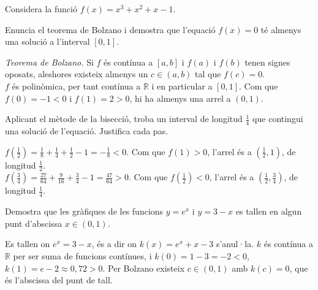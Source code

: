 Considera la funció $f(x)=x^3+x^2+x-1$.

\begin{apartats}

Enuncia el teorema de Bolzano i demostra que l'equació $f(x)=0$ té almenys una solució
a l'interval $[0,1]$.

\begin{solucio}
\emph{Teorema de Bolzano.} Si $f$ és contínua a $[a,b]$ i $f(a)$ i $f(b)$ tenen signes
oposats, aleshores existeix almenys un $c\in(a,b)$ tal que $f(c)=0$.\\
$f$ és polinòmica, per tant contínua a $\mathbb{R}$ i en particular a $[0,1]$.
Com que $f(0)=-1<0$ i $f(1)=2>0$, hi ha almenys una arrel a $(0,1)$.
\end{solucio}

Aplicant el mètode de la bisecció, troba un interval de longitud $\tfrac14$ que contingui
una solució de l'equació. Justifica cada pas.

\begin{solucio}
$f\!\left(\tfrac12\right)=\tfrac18+\tfrac14+\tfrac12-1=-\tfrac18<0$. Com que
$f(1)>0$, l'arrel és a $\left(\tfrac12,1\right)$, de longitud $\tfrac12$.\\
$f\!\left(\tfrac34\right)=\tfrac{27}{64}+\tfrac{9}{16}+\tfrac34-1=\tfrac{47}{64}>0$.
Com que $f\!\left(\tfrac12\right)<0$, l'arrel és a
$\left(\tfrac12,\tfrac34\right)$, de longitud $\tfrac14$.
\end{solucio}

Demostra que les gràfiques de les funcions $y=e^{x}$ i $y=3-x$ es tallen en algun punt
d'abscissa $x\in(0,1)$.

\begin{solucio}
Es tallen on $e^x=3-x$, és a dir on $k(x)=e^x+x-3$ s'anul·la. $k$ és contínua a
$\mathbb{R}$ per ser suma de funcions contínues, i
$k(0)=1-3=-2<0$, $k(1)=e-2\approx0{,}72>0$.
Per Bolzano existeix $c\in(0,1)$ amb $k(c)=0$, que és l'abscissa del punt de tall.
\end{solucio}

\end{apartats}
